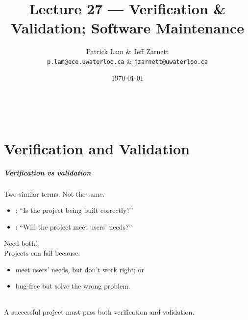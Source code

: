 
\usepackage{tikz-3dplot}

\title{Lecture 27 --- Verification \& Validation; Software Maintenance}

\author{Patrick Lam \& Jeff Zarnett \\ \small \texttt{p.lam@ece.uwaterloo.ca} \& \texttt{jzarnett@uwaterloo.ca}}
\date{\today}



\begin{frame}
  \titlepage

  \vfill
  \begin{center}
    \\
                  {\tiny\CcNote{\CcLongnameByNcSa}}
                  \vspace*{-2.5ex}
  \end{center}

\end{frame}
\part{Verification and Validation}
\frame{\partpage}

\begin{frame}
\frametitle{Verification vs validation}
\begin{changemargin}{1cm}

Two similar terms. Not the same.
\begin{itemize}
\item {}: ``Is the project being built correctly?''
\item {}: ``Will the project meet users' needs?''
\end{itemize}

Need both!\\[1em]

Projects can fail because:
\begin{itemize}
\item meet users' needs, but don't work right; or
\item bug-free but solve the wrong problem.
\end{itemize}~\\

{\Large A successful project must pass both verification and validation.}
\end{changemargin}
\end{frame}

